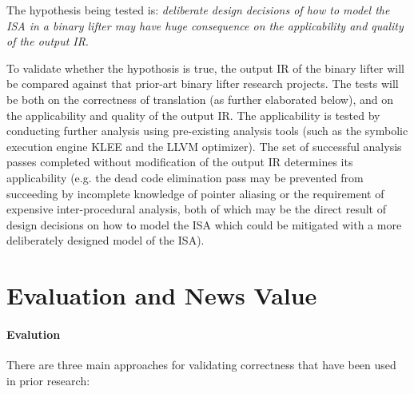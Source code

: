 \documentclass[12pt, a4paper]{article}
\begin{document}
The hypothesis being tested is: \textit{deliberate design decisions of how to model the ISA in a binary lifter may have huge consequence on the applicability and quality of the output IR}.

To validate whether the hypothosis is true, the output IR of the binary lifter will be compared against that prior-art binary lifter research projects. The tests will be both on the correctness of translation (as further elaborated below), and on the applicability and quality of the output IR. The applicability is tested by conducting further analysis using pre-existing analysis tools (such as the symbolic execution engine KLEE and the LLVM optimizer). The set of successful analysis passes completed without modification of the output IR determines its applicability (e.g. the dead code elimination pass may be prevented from succeeding by incomplete knowledge of pointer aliasing or the requirement of expensive inter-procedural analysis, both of which may be the direct result of design decisions on how to model the ISA which could be mitigated with a more deliberately designed model of the ISA).


\section{Evaluation and News Value}


\paragraph{Evalution}

There are three main approaches for validating correctness that have been used in prior research:
\end{document}
